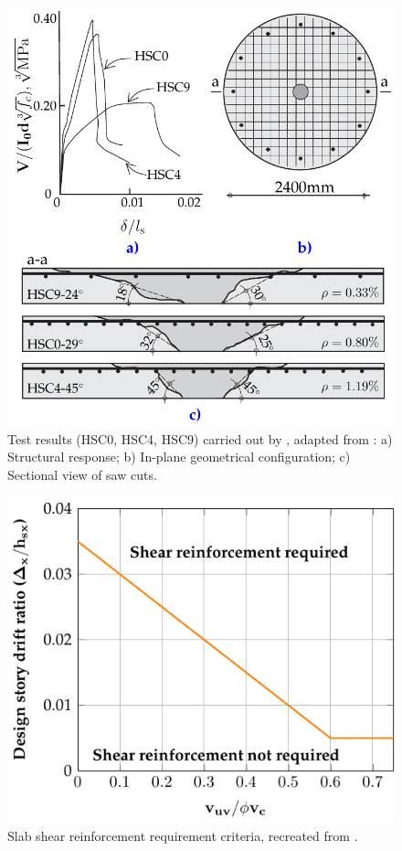 \begin{figure}\centering
\includegraphics[width=\columnwidth]{Figures/tikzout/b16if3.pdf}\caption{Test results (HSC0, HSC4, HSC9) carried out by \cite{hallgren1996punching},  adapted from \cite{bompa2016b}: a) Structural response; b) In-plane geometrical configuration; c) Sectional view of saw cuts.}\label{b16if3}
\end{figure}
\begin{figure}\centering
    \includegraphics[width=\columnwidth]{Figures/tikzout/fr181451.pdf}\caption{Slab shear reinforcement requirement criteria, recreated from \cite{aci31819}.}\label{fr181451}
    \end{figure}
